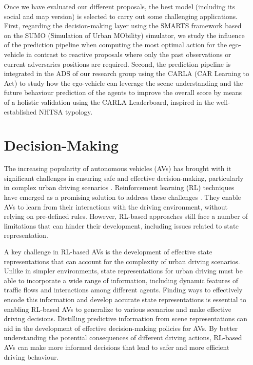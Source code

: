 Once we have evaluated our different proposals, the best model (including its social and map version) is selected to carry out some challenging applications. First, regarding the decision-making layer using the SMARTS \cite{SMARTS} framework based on the SUMO (Simulation of Urban MObility) \cite{Sumo} simulator, we study the influence of the prediction pipeline when computing the most optimal action for the ego-vehicle in contrast to reactive proposals where only the past observations or current adversaries positions are required. Second, the prediction pipeline is integrated in the \ac{ADS} of our research group using the CARLA \cite{dosovitskiy2017carla} (CAR Learning to Act) to study how the ego-vehicle can leverage the scene understanding and the future behaviour prediction of the agents to improve the overall score by means of a holistic validation using the CARLA Leaderboard, inspired in the well-established NHTSA typology.

\section{Decision-Making}
\label{sec:8_decision_making}


The increasing popularity of autonomous vehicles (AVs) has brought with it significant challenges in ensuring safe and effective decision-making, particularly in complex urban driving scenarios \cite{Yurtsever2019}. Reinforcement learning (RL) techniques have emerged as a promising solution to address these challenges \cite{Ravi2020}. They enable AVs to learn from their interactions with the driving environment, without relying on pre-defined rules. However, RL-based approaches still face a number of limitations that can hinder their development, including issues related to state representation.

A key challenge in RL-based AVs is the development of effective state representations that can account for the complexity of urban driving scenarios. Unlike in simpler environments, state representations for urban driving must be able to incorporate a wide range of information, including dynamic features of traffic flows and interactions among different agents. Finding ways to effectively encode this information and develop accurate state representations is essential to enabling RL-based AVs to generalize to various scenarios and make effective driving decisions. Distilling predictive information from scene representations can aid in the development of effective decision-making policies for AVs. By better understanding the potential consequences of different driving actions, RL-based AVs can make more informed decisions that lead to safer and more efficient driving behaviour.

